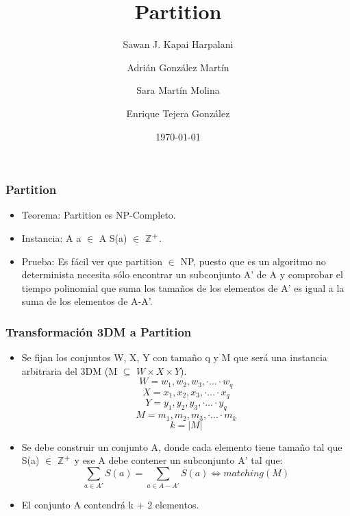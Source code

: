 \documentclass{beamer}
\title[Short title]{ Partition }
\author{Sawan J. Kapai Harpalani \and
	Adri\'an Gonz\'alez Mart\'in \and
	Sara Mart\'in Molina \and
	Enrique Tejera Gonz\'alez
}
\institute[ULL] 
{
Universidad de La Laguna \\ 
\medskip
}
\date{\today}
\begin{document}
\begin{frame}

\titlepage 

\end{frame}



\begin{frame}
\frametitle{Partition}
\begin{itemize}
  \item Teorema: Partition es NP-Completo.
  \item Instancia:  A  a $\in$ A S(a) $\in$ \(\mathbb{Z}\)$\textsuperscript{+}$.
  \item Prueba: Es f\'acil ver que partition $\in$ NP, puesto que es un algoritmo
  no determinista necesita s\'olo encontrar un subconjunto A' de A y comprobar el
  tiempo polinomial que suma los tama\~{n}os de los elementos de A' es igual a la
  suma de los elementos de A-A'.
  
\end{itemize}  
\end{frame}


\begin{frame}
\frametitle{Transformaci\'on 3DM a Partition}
\begin{itemize}
\item Se fijan los conjuntos W, X, Y con tamaño q y M que ser\'a una instancia
arbitraria del 3DM (M $\subseteq$ $W \times X \times Y$).
	$$W = w_{1}, w_{2}, w_{3}, \cdot\ldots\cdot w_{q}$$
	$$X = x_{1}, x_{2}, x_{3}, \cdot\ldots\cdot x_{q}$$
	$$Y = y_{1}, y_{2}, y_{3}, \cdot\ldots\cdot y_{q}$$
	$$M = m_{1}, m_{2}, m_{3}, \cdot\ldots\cdot m_{k}$$ 
	$$ k = |M|$$
	
\item Se debe construir un conjunto A, donde cada elemento tiene tama\~{n}o tal que S(a) $\in$ \(\mathbb{Z}\)$\textsuperscript{+}$ y ese A debe contener un subconjunto A' tal que:
	$$\sum\limits_{a \in A'} S(a) = \sum\limits_{a \in A - A'} S(a) \iff matching(M)$$
\item El conjunto A contendr\'a k + 2 elementos.
\end{itemize}
\end{frame}
\end{document}
